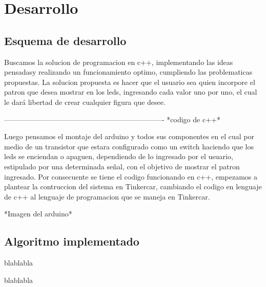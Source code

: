 \documentclass{article}
\begin{document}
\vspace{14cm}

\section{Desarrollo} \label{contenido}
\subsection{Esquema de desarrollo}

Buscamos la solucion de programacion en c++, implementando las ideas pensadasy realizando un funcionamiento optimo, cumpliendo las problematicas propuestas.
 \vspace{1cm}
La solucion propuesta es hacer que el usuario sea quien incorpore el patron que desea mostrar en los leds, ingresando cada valor uno por uno, el cual le dará libertad de crear cualquier figura que desee.


\space

 -------------------------------------------------------------------
*codigo de c++*


Luego pensamos el montaje del arduino y todos sus componentes en el cual por medio de un transistor que estara configurado como un switch haciendo que los leds se enciendan o apaguen, dependiendo de lo ingresado por el usuario, estipulado por una determinada señal, con el objetivo de mostrar el patron ingresado.
 \vspace{1cm}
Por consecuente se tiene el codigo funcionando en c++, empezamos a plantear la contruccion del sistema en Tinkercar, cambiando el codigo en lenguaje de c++ al lenguaje de programacion que se maneja en Tinkercar.
 \vspace{1cm}

*Imagen del arduino*






\vspace{8cm}

\subsection{Algoritmo implementado}

blablabla

 \vspace{1cm}
 
blablabla

 \vspace{1cm}
 
\end{document}

